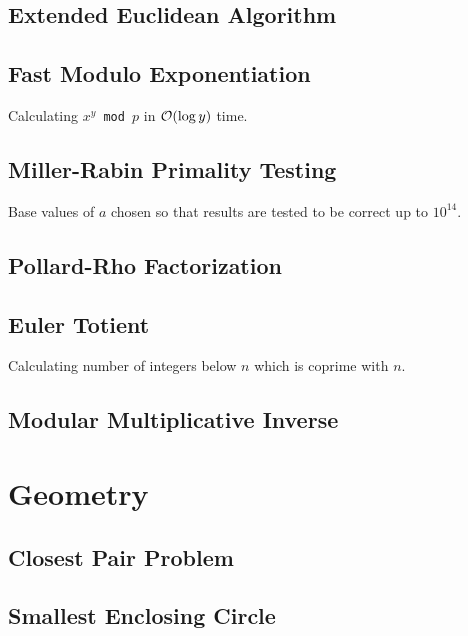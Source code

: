 \documentclass[landscape,8pt]{article}
\begin{document}
\begin{multicols}{2}
  \subsection{Extended Euclidean Algorithm}
    
  \subsection{Fast Modulo Exponentiation}
  Calculating \texttt{$x^y$ mod $p$} in $\order{\log y}$ time.
    

  \subsection{Miller-Rabin Primality Testing}
  Base values of $a$ chosen so that results are tested to be correct up to $10^14$.
  

  \subsection{Pollard-Rho Factorization}
  
  \subsection{Euler Totient}
  Calculating number of integers below $n$ which is coprime with $n$.
    

  \subsection{Modular Multiplicative Inverse}
    

\columnbreak
\section{Geometry}
  \subsection{Closest Pair Problem}

  \subsection{Smallest Enclosing Circle}


\end{multicols}
\end{document}
